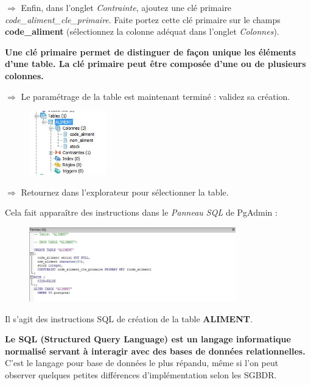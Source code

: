 \documentclass[11pt]{article}
\newcommand{\action}{$\Rightarrow$ }
\begin{document}
\vspace{1em}
			
\action Enfin, dans l'onglet \textit{Contrainte}, ajoutez une clé primaire \textit{code\_aliment\_cle\_primaire}. Faite portez cette clé primaire sur le champs \textbf{code\_aliment} (sélectionnez la colonne adéquat dans l'onglet \textit{Colonnes}).
			
\textbf{Une clé primaire permet de distinguer de façon unique les éléments d'une table. La clé primaire peut être composée d'une ou de plusieurs colonnes.} 
			
\action Le paramétrage de la table est maintenant terminé : validez sa création.
\begin{figure}[H]
	\center \includegraphics[width=0.3\textwidth]{img/pgadmin_table_aliment.jpg}\\[1em]
\end{figure}
			
\action Retournez dans l'explorateur pour sélectionner la table.
			
Cela fait apparaître des instructions dans le \textit{Panneau SQL} de PgAdmin :
\begin{figure}[H]
	\center \includegraphics[width=0.8\textwidth]{img/pgadmin_panneau_sql.jpg}\\[1em]
\end{figure}

Il s'agit des instructions SQL de création de la table \textbf{ALIMENT}.

\textbf{Le SQL (Structured Query Language) est un langage informatique normalisé servant à interagir avec des bases de données relationnelles.} C'est le langage pour base de données le plus répandu, même si l'on peut observer quelques petites différences d'implémentation selon les SGBDR.
\end{document}
